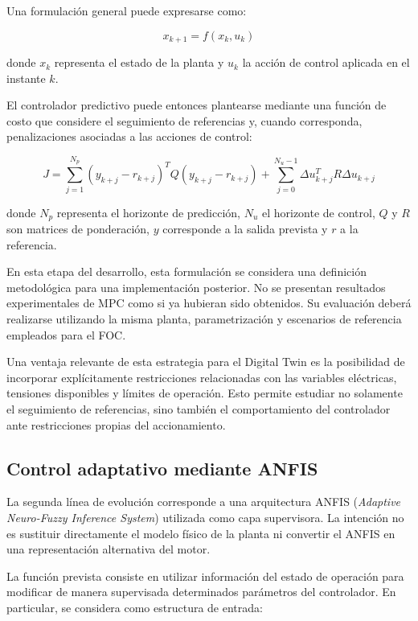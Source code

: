 Una formulación general puede expresarse como:

\begin{equation}
x_{k+1}=f(x_k,u_k)
\end{equation}

donde $x_k$ representa el estado de la planta y $u_k$ la acción de control aplicada en el instante $k$.

El controlador predictivo puede entonces plantearse mediante una función de costo que considere el seguimiento de referencias y, cuando corresponda, penalizaciones asociadas a las acciones de control:

\begin{equation}
J=
\sum_{j=1}^{N_p}
\left(y_{k+j}-r_{k+j}\right)^{T}
Q
\left(y_{k+j}-r_{k+j}\right)
+
\sum_{j=0}^{N_u-1}
\Delta u_{k+j}^{T}
R
\Delta u_{k+j}
\end{equation}

donde $N_p$ representa el horizonte de predicción, $N_u$ el horizonte de control, $Q$ y $R$ son matrices de ponderación, $y$ corresponde a la salida prevista y $r$ a la referencia.

En esta etapa del desarrollo, esta formulación se considera una definición metodológica para una implementación posterior. No se presentan resultados experimentales de MPC como si ya hubieran sido obtenidos. Su evaluación deberá realizarse utilizando la misma planta, parametrización y escenarios de referencia empleados para el FOC.

Una ventaja relevante de esta estrategia para el Digital Twin es la posibilidad de incorporar explícitamente restricciones relacionadas con las variables eléctricas, tensiones disponibles y límites de operación. Esto permite estudiar no solamente el seguimiento de referencias, sino también el comportamiento del controlador ante restricciones propias del accionamiento.

\subsection{Control adaptativo mediante ANFIS}

La segunda línea de evolución corresponde a una arquitectura ANFIS (\textit{Adaptive Neuro-Fuzzy Inference System}) utilizada como capa supervisora. La intención no es sustituir directamente el modelo físico de la planta ni convertir el ANFIS en una representación alternativa del motor.

La función prevista consiste en utilizar información del estado de operación para modificar de manera supervisada determinados parámetros del controlador. En particular, se considera como estructura de entrada:

